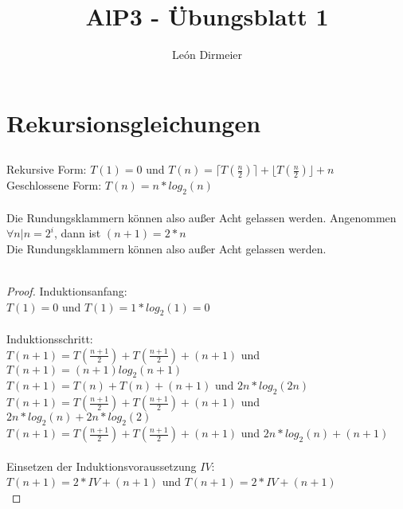 \documentclass[10pt,ngerman]{article}
\begin{document}
	\title{AlP3 - Übungsblatt 1}
	\author{León Dirmeier}
	\maketitle
	
	\renewcommand\thesubsection{(\alph{subsection})}
	\lstset{style=code}

	\section{Rekursionsgleichungen}
	\subsection{}
	Rekursive Form: $T(1)=0$ und $T(n)=\lceil T(\frac{n}{2}) \rceil + \lfloor T(\frac{n}{2})\rfloor + n$\\
	Geschlossene Form: $T(n)=n*log_2(n)$\\\\
	Die Rundungsklammern können also außer Acht gelassen werden.
	Angenommen $\forall n | n=2^i$, dann ist $(n+1) = 2*n$ \\
	Die Rundungsklammern können also außer Acht gelassen werden.\\\\
	\begin{proof}
	
	Induktionsanfang:\\
	$T(1)=0$ und $T(1)=1*log_2(1)=0$\\\\
	Induktionsschritt:\\
	$T(n+1)=T(\frac{n+1}{2})+T(\frac{n+1}{2})+(n+1)$ und $T(n+1)=(n+1)log_2(n+1)$\\
	$T(n+1)=T(n)+T(n)+(n+1)$ und $2n*log_2(2n)$\\
	$T(n+1)=T(\frac{n+1}{2})+T(\frac{n+1}{2})+(n+1)$ und $2n*log_2(n)+2n*log_2(2)$\\
	$T(n+1)=T(\frac{n+1}{2})+T(\frac{n+1}{2})+(n+1)$ und $2n*log_2(n)+(n+1)$\\\\
	Einsetzen der Induktionsvoraussetzung $IV$:\\
	$T(n+1)=2*IV+(n+1)$ und $T(n+1)=2*IV+(n+1)$\\	
	\end{proof}
	
\end{document}
